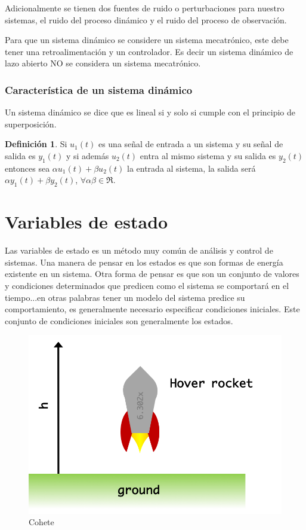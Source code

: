 \documentclass[12pt]{book}
\theoremstyle{definition}
\newtheorem{dfn}{Definición}[section]
\theoremstyle{remark}
\theoremstyle{plain}
\begin{document}
Adicionalmente se tienen dos fuentes de ruido o perturbaciones para nuestro sistemas, el ruido del proceso dinámico y el ruido del proceso de observación.

Para que un sistema dinámico se considere un sistema mecatrónico, este debe tener una retroalimentación y un controlador. Es decir un sistema dinámico de lazo abierto NO se considera un sistema mecatrónico.

\subsection{Característica de un sistema dinámico}

Un sistema dinámico se dice que es lineal si y solo si cumple con el principio de superposición.

\begin{dfn}
\label{def1}
Si $u_1(t)$ es una señal de entrada a un sistema y su señal de salida es $y_1(t)$ y si además $u_2 (t)$ entra al mismo sistema y su salida es $y_2 (t)$ entonces sea $\alpha u_1(t)+ \beta u_2 (t)$ la entrada al sistema, la salida será $\alpha y_1 (t)+ \beta y_2 (t)$, $\forall \alpha \beta \in \Re$.
\end{dfn}

\chapter{Variables de estado}
Las  variables de estado es un método muy común de análisis y control de sistemas. Una manera de pensar en los estados es que son formas de energía existente en un sistema. Otra forma de pensar es que son un conjunto de valores y condiciones determinados que predicen como el sistema se comportará en el tiempo...en otras palabras tener un modelo del sistema predice su comportamiento, es generalmente necesario especificar condiciones iniciales. Este conjunto de condiciones iniciales son generalmente los estados.

\begin{figure}
\centering
\includegraphics[width=5in]{hover_rocket_1.png}
\caption{Cohete}
\label{fig800}
\end{figure}
\end{document}
